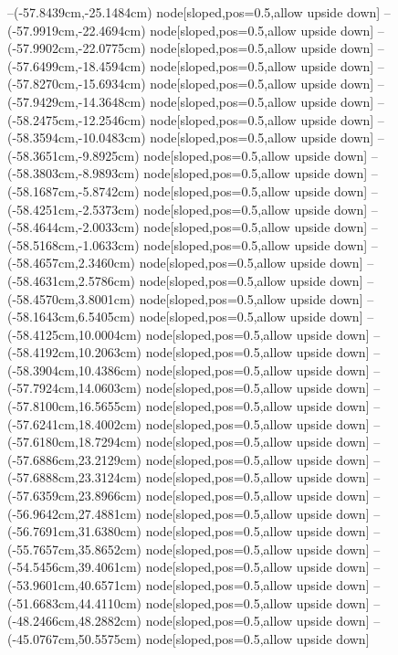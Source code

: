 --(-57.8439cm,-25.1484cm) node[sloped,pos=0.5,allow upside down]{\ArrowIn}
--(-57.9919cm,-22.4694cm) node[sloped,pos=0.5,allow upside down]{\ArrowIn}
--(-57.9902cm,-22.0775cm) node[sloped,pos=0.5,allow upside down]{\arrowIn}
--(-57.6499cm,-18.4594cm) node[sloped,pos=0.5,allow upside down]{\ArrowIn}
--(-57.8270cm,-15.6934cm) node[sloped,pos=0.5,allow upside down]{\ArrowIn}
--(-57.9429cm,-14.3648cm) node[sloped,pos=0.5,allow upside down]{\ArrowIn}
--(-58.2475cm,-12.2546cm) node[sloped,pos=0.5,allow upside down]{\ArrowIn}
--(-58.3594cm,-10.0483cm) node[sloped,pos=0.5,allow upside down]{\ArrowIn}
--(-58.3651cm,-9.8925cm) node[sloped,pos=0.5,allow upside down]{\arrowIn}
--(-58.3803cm,-8.9893cm) node[sloped,pos=0.5,allow upside down]{\arrowIn}
--(-58.1687cm,-5.8742cm) node[sloped,pos=0.5,allow upside down]{\ArrowIn}
--(-58.4251cm,-2.5373cm) node[sloped,pos=0.5,allow upside down]{\ArrowIn}
--(-58.4644cm,-2.0033cm) node[sloped,pos=0.5,allow upside down]{\arrowIn}
--(-58.5168cm,-1.0633cm) node[sloped,pos=0.5,allow upside down]{\arrowIn}
--(-58.4657cm,2.3460cm) node[sloped,pos=0.5,allow upside down]{\ArrowIn}
--(-58.4631cm,2.5786cm) node[sloped,pos=0.5,allow upside down]{\arrowIn}
--(-58.4570cm,3.8001cm) node[sloped,pos=0.5,allow upside down]{\ArrowIn}
--(-58.1643cm,6.5405cm) node[sloped,pos=0.5,allow upside down]{\ArrowIn}
--(-58.4125cm,10.0004cm) node[sloped,pos=0.5,allow upside down]{\ArrowIn}
--(-58.4192cm,10.2063cm) node[sloped,pos=0.5,allow upside down]{\arrowIn}
--(-58.3904cm,10.4386cm) node[sloped,pos=0.5,allow upside down]{\arrowIn}
--(-57.7924cm,14.0603cm) node[sloped,pos=0.5,allow upside down]{\ArrowIn}
--(-57.8100cm,16.5655cm) node[sloped,pos=0.5,allow upside down]{\ArrowIn}
--(-57.6241cm,18.4002cm) node[sloped,pos=0.5,allow upside down]{\ArrowIn}
--(-57.6180cm,18.7294cm) node[sloped,pos=0.5,allow upside down]{\arrowIn}
--(-57.6886cm,23.2129cm) node[sloped,pos=0.5,allow upside down]{\ArrowIn}
--(-57.6888cm,23.3124cm) node[sloped,pos=0.5,allow upside down]{\arrowIn}
--(-57.6359cm,23.8966cm) node[sloped,pos=0.5,allow upside down]{\arrowIn}
--(-56.9642cm,27.4881cm) node[sloped,pos=0.5,allow upside down]{\ArrowIn}
--(-56.7691cm,31.6380cm) node[sloped,pos=0.5,allow upside down]{\ArrowIn}
--(-55.7657cm,35.8652cm) node[sloped,pos=0.5,allow upside down]{\ArrowIn}
--(-54.5456cm,39.4061cm) node[sloped,pos=0.5,allow upside down]{\ArrowIn}
--(-53.9601cm,40.6571cm) node[sloped,pos=0.5,allow upside down]{\ArrowIn}
--(-51.6683cm,44.4110cm) node[sloped,pos=0.5,allow upside down]{\ArrowIn}
--(-48.2466cm,48.2882cm) node[sloped,pos=0.5,allow upside down]{\ArrowIn}
--(-45.0767cm,50.5575cm) node[sloped,pos=0.5,allow upside down]{\ArrowIn}
